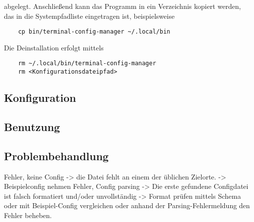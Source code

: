\documentclass[a4paper,11pt]{scrartcl} %
\begin{document}
abgelegt. Anschließend kann das Programm in ein Verzeichnis kopiert werden, das in die
Systempfadliste eingetragen ist, beispielsweise

\begin{verbatim}
	cp bin/terminal-config-manager ~/.local/bin
\end{verbatim}

Die Deinstallation erfolgt mittels

\begin{verbatim}
	rm ~/.local/bin/terminal-config-manager
	rm <Konfigurationsdateipfad>
\end{verbatim}

\subsection{Konfiguration}

\subsection{Benutzung}

\subsection{Problembehandlung}
Fehler, keine Config -> die Datei fehlt an einem der üblichen Zielorte.
-> Beispielconfig nehmen
Fehler, Config parsing -> Die erste gefundene Configdatei ist falsch
formatiert und/oder unvollständig -> Format prüfen mittels Schema
oder mit Beispiel-Config vergleichen oder anhand der Parsing-Fehlermeldung
den Fehler beheben.
\end{document}
